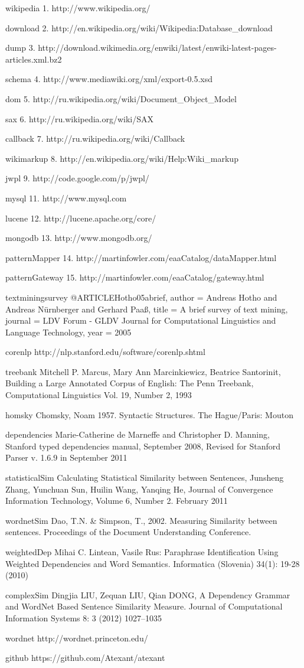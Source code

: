 
wikipedia
1. http://www.wikipedia.org/

download
2. http://en.wikipedia.org/wiki/Wikipedia:Database_download

dump
3. http://download.wikimedia.org/enwiki/latest/enwiki-latest-pages-articles.xml.bz2

schema
4. http://www.mediawiki.org/xml/export-0.5.xsd

dom
5. http://ru.wikipedia.org/wiki/Document_Object_Model

sax
6. http://ru.wikipedia.org/wiki/SAX

callback
7. http://ru.wikipedia.org/wiki/Callback

wikimarkup
8. http://en.wikipedia.org/wiki/Help:Wiki_markup

jwpl
9. http://code.google.com/p/jwpl/

mysql
11. http://www.mysql.com

lucene
12. http://lucene.apache.org/core/

mongodb
13. http://www.mongodb.org/

patternMapper
14. http://martinfowler.com/eaaCatalog/dataMapper.html

patternGateway
15. http://martinfowler.com/eaaCatalog/gateway.html

textminingsurvey
@ARTICLE{Hotho05abrief,
    author = {Andreas Hotho and Andreas Nürnberger and Gerhard Paaß},
    title = {A brief survey of text mining},
    journal = {LDV Forum - GLDV Journal for Computational Linguistics and Language Technology},
    year = {2005}
}

corenlp
http://nlp.stanford.edu/software/corenlp.shtml

treebank
Mitchell  P. Marcus, Mary Ann Marcinkiewicz, Beatrice Santorinit, Building a Large Annotated Corpus of English: The Penn Treebank, Computational Linguistics Vol. 19, Number 2, 1993

homsky
Chomsky, Noam 1957. Syntactic Structures. The Hague/Paris: Mouton

dependencies
Marie-Catherine de Marneffe and Christopher D. Manning, Stanford typed dependencies manual, September 2008, Revised for Stanford Parser v. 1.6.9 in September 2011

statisticalSim
Calculating Statistical Similarity between Sentences, Junsheng Zhang, Yunchuan Sun, Huilin Wang, Yanqing He, Journal of Convergence Information Technology, Volume 6, Number 2. February 2011

wordnetSim
Dao, T.N. & Simpson, T., 2002. Measuring Similarity between sentences. Proceedings of the Document Understanding Conference. 

weightedDep
Mihai C. Lintean, Vasile Rus: Paraphrase Identification Using Weighted Dependencies and Word Semantics. Informatica (Slovenia) 34(1): 19-28 (2010)

complexSim
Dingjia LIU, Zequan LIU, Qian DONG, A Dependency Grammar and WordNet Based Sentence Similarity Measure. Journal of Computational Information Systems 8: 3 (2012) 1027–1035

wordnet
http://wordnet.princeton.edu/

github
https://github.com/Atexant/atexant
